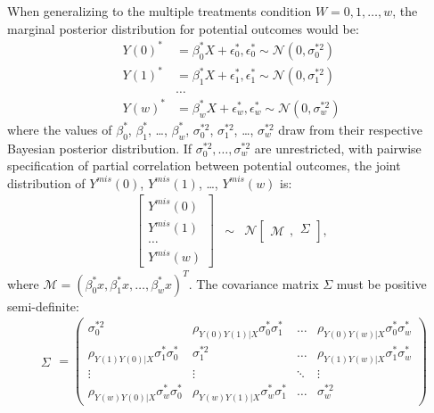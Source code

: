 	When generalizing to the multiple treatments condition $W = 0, 1,\dots,w$, the marginal posterior distribution for potential outcomes would be:
	\begin{align*}
		Y(0)^{*} &= \beta_{0}^{*}X + \epsilon_{0}^{*}, \epsilon_{0}^{*} \sim \mathcal{N}(0, \sigma_{0}^{*2})\\
		Y(1)^{*} &= \beta_{1}^{*}X + \epsilon_{1}^{*}, \epsilon_{1}^{*} \sim \mathcal{N}(0, \sigma_{1}^{*2})\\
		&\dots\\
		Y(w)^{*} &= \beta_{w}^{*}X + \epsilon_{w}^{*}, \epsilon_{w}^{*} \sim \mathcal{N}(0, \sigma_{w}^{*2})
	\end{align*}
	where the values of $\beta_{0}^{*}$, $\beta_{1}^{*}$, \dots, $\beta_{w}^{*}$, $\sigma_{0}^{*2}$, $\sigma_{1}^{*2}$, \dots, $\sigma_{w}^{*2}$  draw from their respective Bayesian posterior distribution.
	If $\sigma_{0}^{*2}, \dots, \sigma_{w}^{*2}$ are unrestricted, with pairwise specification of partial correlation between potential outcomes, the joint distribution of $Y^{mis}(0)$, $Y^{mis}(1)$, \dots, $Y^{mis}(w)$ is:
	\begin{eqnarray}
		\left[\begin{array}{c}
			Y^{mis}(0)\\
			Y^{mis}(1)\\
			\dots\\
			Y^{mis}(w)
		\end{array}\right] & \sim & \mathcal{N}\left[\begin{array}{c}
			\mathcal{M}
		\end{array},\begin{array}{c}
			\Sigma\\
		\end{array}\right],
	\end{eqnarray}
	where  $\mathcal{M} = (\beta^{*}_{0}x, \beta^{*}_{1}x, \dots, \beta^{*}_{w}x)^T$. The covariance matrix $\Sigma$ must be positive semi-definite:
	\begin{eqnarray}
		\begin{array}{c}
			\Sigma
		\end{array} = \left(\begin{array}{cccc}
			\sigma^{*2}_{0} & \rho_{Y(0)Y(1)|X}\sigma^{*}_{0}\sigma^{*}_{1} & \dots & \rho_{Y(0)Y(w)|X}\sigma^{*}_{0}\sigma^{*}_{w}\\
			\rho_{Y(1)Y(0)|X}\sigma^{*}_{1}\sigma^{*}_{0} & \sigma^{*2}_{1} & \dots & \rho_{Y(1)Y(w)|X}\sigma^{*}_{1}\sigma^{*}_{w}\\
			\vdots & \vdots & \ddots & \vdots\\
			\rho_{Y(w)Y(0)|X}\sigma^{*}_{w}\sigma^{*}_{0} & \rho_{Y(w)Y(1)|X}\sigma^{*}_{w}\sigma^{*}_{1} & \dots & \sigma^{*2}_{w}
		\end{array}\right)
	\end{eqnarray} 
